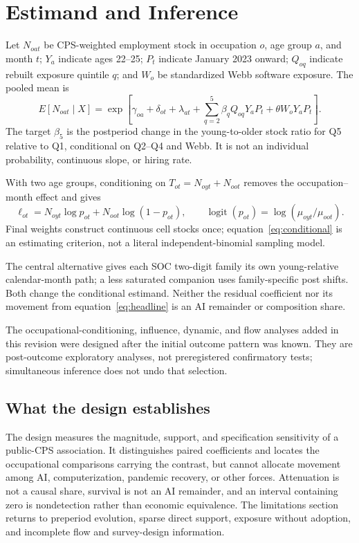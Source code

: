 \section{Estimand and Inference}\label{sec:design}

Let $N_{oat}$ be CPS-weighted employment stock in occupation $o$, age group $a$, and month $t$; $Y_a$ indicate ages 22--25; $P_t$ indicate January 2023 onward; $Q_{oq}$ indicate rebuilt exposure quintile $q$; and $W_o$ be standardized Webb software exposure.  The pooled mean is
\begin{equation}
E[N_{oat}\mid X]=\exp\!\left[\gamma_{oa}+\delta_{ot}+\lambda_{at}
+\sum_{q=2}^{5}\beta_q Q_{oq}Y_aP_t+\theta W_oY_aP_t\right].
\label{eq:headline}
\end{equation}
The target $\beta_5$ is the postperiod change in the young-to-older stock ratio for Q5 relative to Q1, conditional on Q2--Q4 and Webb.  It is not an individual probability, continuous slope, or hiring rate.

With two age groups, conditioning on $T_{ot}=N_{oyt}+N_{oot}$ removes the occupation--month effect and gives
\begin{equation}
\ell_{ot}=N_{oyt}\log p_{ot}+N_{oot}\log(1-p_{ot}),\qquad
\operatorname{logit}(p_{ot})=\log(\mu_{oyt}/\mu_{oot}).
\label{eq:conditional}
\end{equation}
Final weights construct continuous cell stocks once; equation~\eqref{eq:conditional} is an estimating criterion, not a literal independent-binomial sampling model.

The central alternative gives each SOC two-digit family its own young-relative calendar-month path; a less saturated companion uses family-specific post shifts.  Both change the conditional estimand.  Neither the residual coefficient nor its movement from equation~\eqref{eq:headline} is an AI remainder or composition share.

The occupational-conditioning, influence, dynamic, and flow analyses added in this revision were designed after the initial outcome pattern was known.  They are post-outcome exploratory analyses, not preregistered confirmatory tests; simultaneous inference does not undo that selection.

\subsection{What the design establishes}

The design measures the magnitude, support, and specification sensitivity of a public-CPS association.  It distinguishes paired coefficients and locates the occupational comparisons carrying the contrast, but cannot allocate movement among AI, computerization, pandemic recovery, or other forces.  Attenuation is not a causal share, survival is not an AI remainder, and an interval containing zero is nondetection rather than economic equivalence.  The limitations section returns to preperiod evolution, sparse direct support, exposure without adoption, and incomplete flow and survey-design information.

